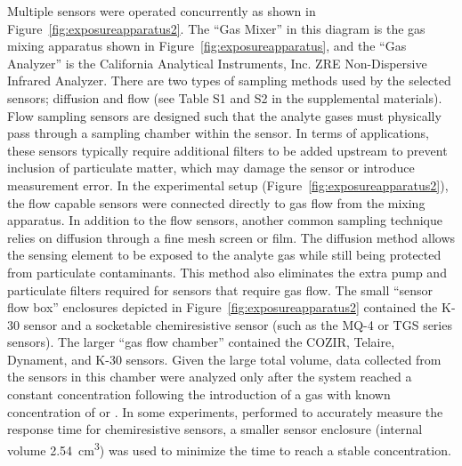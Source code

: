 \documentclass[sensors,article,submit,moreauthors,pdftex]{Definitions/mdpi}
\begin{document}
			Multiple sensors were operated concurrently as shown in Figure~\ref{fig:exposureapparatus2}.
			The ``Gas Mixer'' in this diagram is the gas mixing apparatus shown in Figure~\ref{fig:exposureapparatus}, and the ``Gas Analyzer'' is the California Analytical Instruments, Inc. ZRE Non-Dispersive Infrared Analyzer.
			There are two types of sampling methods used by the selected sensors; diffusion and flow (see Table S1 and S2 in the supplemental materials).
			Flow sampling sensors are designed such that the analyte gases must physically pass through a sampling chamber within the sensor.
			In terms of applications, these sensors typically require additional filters to be added upstream to prevent inclusion of particulate matter, which may damage the sensor or introduce measurement error.
			In the experimental setup (Figure~\ref{fig:exposureapparatus2}), the flow capable sensors were connected directly to gas flow from the mixing apparatus.
			In addition to the flow sensors, another common sampling technique relies on diffusion through a fine mesh screen or film.
			The diffusion method allows the sensing element to be exposed to the analyte gas while still being protected from particulate contaminants.
			This method also eliminates the extra pump and particulate filters required for sensors that require gas flow.
			The small ``sensor flow box'' enclosures depicted in Figure~\ref{fig:exposureapparatus2} contained the K-30  sensor and a socketable chemiresistive  sensor (such as the MQ-4 or TGS series sensors).
			The larger ``gas flow chamber'' contained the COZIR, Telaire, Dynament, and K-30 sensors.
			Given the large total volume, data collected from the sensors in this chamber were analyzed only after the system reached a constant concentration following the introduction of a gas with known concentration of  or .
			In some experiments, performed to accurately measure the response time for chemiresistive sensors, a smaller sensor enclosure (internal volume \SI{2.54}{\centi\meter\cubed}) was used to minimize the time to reach a stable concentration.
			
\end{document}
